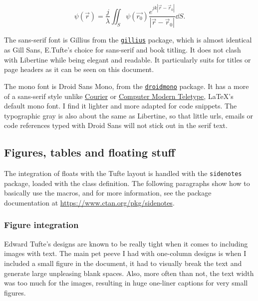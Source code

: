 \documentclass[
	raggedright,
	twoside,
	12pt,
	colorful,
]{tufte-style-article}
\begin{document}
\begin{equation}
\psi(\vec r) = \frac{j}{\lambda} \iint_S \psi(\vec{r_0})\frac{e^{jk|\vec r - \vec r_0|}}{|\vec r - \vec r_0|}\dd S.
\end{equation}

\begingroup\sffamily
The sans-serif font is Gillius from the \href{www.ctan.org/pkg/gillius}{\texttt{gillius}} package, which is almost identical as Gill Sans, E.Tufte's choice for sans-serif and book titling. It does not clash with Libertine while being elegant and readable. It particularly suits for titles or page headers as it can be seen on this document.
\endgroup

\begingroup\ttfamily
The mono font is Droid Sans Mono, from the \href{www.ctan.org/pkg/droid}{\texttt{droidmono}} package. It has a more of a sans-serif style unlike \href{www.ctan.org/tex-archive/fonts/psfonts/psnfss-source/courier}{Courier} or \href{www.ctan.org/tex-archive/fonts/cm/}{Computer Modern Teletype}, \LaTeX{}'s default mono font. I find it lighter and more adapted for code snippets. The typographic gray is also about the same as Libertine, so that little urls, emails or code references typed with Droid Sans will not stick out in the serif text.
\endgroup


\subsection{Figures, tables and floating stuff}

The integration of floats with the Tufte layout is handled with the \texttt{sidenotes} package, loaded with the class definition. The following paragraphs show how to basically use the macros, and for more information, see the package documentation at \url{https://www.ctan.org/pkg/sidenotes}.

\subsubsection{Figure integration}

Edward Tufte's designs are known to be really tight when it comes to including images with text. The main pet peeve I had with one-column designs is when I included a small figure in the document, it had to visually break the text and generate large unpleasing blank spaces. Also, more often than not, the text width was too much for the images, resulting in huge one-liner captions for very small figures.
\end{document}
